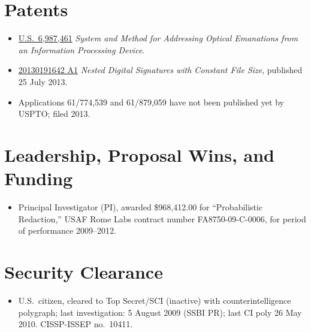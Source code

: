 \documentclass[12pt,twoside,letterpaper]{article}
\begin{document}
\vspace{-9mm}
\section*{Patents}
\vspace{-2mm}
\begin{itemize}
    \item \href{http://www.google.com/patents/US6987461}{U.S.\ 6,987,461}
		\emph{System and Method for Addressing Optical Emanations from an
		Information Processing Device}.
	\vspace{-2mm}
	\item \href{http://appft.uspto.gov/netacgi/nph-Parser?Sect1=PTO1&Sect2=HITOFF&d=PG01&p=1&u=%2Fnetahtml%2FPTO%2Fsrchnum.html&r=1&f=G&l=50&s1=%2220130191642%22.PGNR.&OS=DN/20130191642&RS=DN/20130191642}{20130191642 A1}
		\emph{Nested Digital Signatures with Constant File Size},
		published 25 July 2013.
	\vspace{-1mm}
	\item Applications 61/774,539 and 61/879,059 have not been published
		yet by USPTO; filed 2013.
\end{itemize}

\vspace{-8mm}
\section*{Leadership, Proposal Wins, and Funding}
\vspace{-2mm}
\begin{itemize}
	\item Principal Investigator (PI), awarded \$968,412.00 for ``Probabilistic Redaction,''
	USAF Rome Labs contract number FA8750-09-C-0006, for period of performance 2009--2012.
\end{itemize}

\vspace{-8mm}
\section*{Security Clearance}
\vspace{-2mm}
\begin{itemize}
	\item U.S.\ citizen, cleared to Top Secret/SCI (inactive) with counterintelligence
		polygraph; last investigation: 5 August 2009 (SSBI PR); last CI poly 26 May 2010.
		CISSP-ISSEP no.\ 10411.
\end{itemize}
\end{document}
